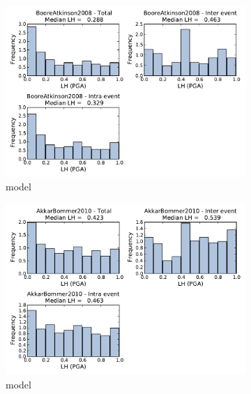 \begin{figure}[htb]
  \centering
  \begin{subfigure}[b]{0.49\textwidth}
      \includegraphics[width=\textwidth]{./figures/residuals/BA2008_LH_PGA.pdf}
      \caption{\cite{boore2008} model}
      \label{fig:pga_lh_ba2008}
  \end{subfigure}
    \begin{subfigure}[b]{0.49\textwidth}
      \includegraphics[width=\textwidth]{./figures/residuals/AB2010_LH_PGA.pdf}
      \caption{\cite{AkkarBommer2010} model}
      \label{fig:pga_lh_ab2010}
  \end{subfigure}
    \begin{subfigure}[b]{0.49\textwidth}

\end{subfigure}
\end{figure}
